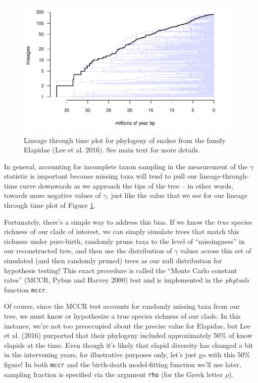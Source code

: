\documentclass[fleqn,10pt,lineno]{wlpeerj} %
\begin{document}
\begin{figure}
\includegraphics[width=1\linewidth]{Revell.phytools-v2_peerj_files/figure-latex/elap-ltt-1} \caption{Lineage through time plot for phylogeny of snakes from the family Elapidae (Lee et al. 2016). See main text for more details.}\label{fig:elap-ltt}
\end{figure}

In general, accounting for incomplete taxon sampling in the measurement of the \(\gamma\) statistic is important because missing taxa will tend to pull our lineage-through-time curve downwards as we approach the tips of the tree -- in other words, towards more negative values of \(\gamma\), just like the value that we see for our lineage through time plot of Figure \ref{fig:elap-ltt}.

Fortunately, there's a simple way to address this bias. If we know the \emph{true} species richness of our clade of interest, we can simply simulate trees that match this richness under pure-birth, randomly prune taxa to the level of ``missingness'' in our reconstructed tree, and then use the distribution of \(\gamma\) values across this set of simulated (and then randomly pruned) trees as our null distribution for hypothesis testing! This exact procedure is called the ``Monte Carlo constant rates'' (MCCR, Pybus and Harvey 2000) test and is implemented in the \emph{phytools} function \texttt{mccr}.

Of course, since the MCCR test accounts for randomly missing taxa from our tree, we must know or hypothesize a true species richness of our clade. In this instance, we're not too preoccupied about the precise value for Elapidae, but Lee et al. (2016) purported that their phylogeny included approximately 50\% of know elapids at the time. Even though it's likely that elapid diversity has changed a bit in the intervening years, for illustrative purposes only, let's just go with this 50\% figure! In both \texttt{mccr} and the birth-death model-fitting function we'll use later, sampling fraction is specified via the argument \texttt{rho} (for the Greek letter \(\rho\)).
\end{document}
